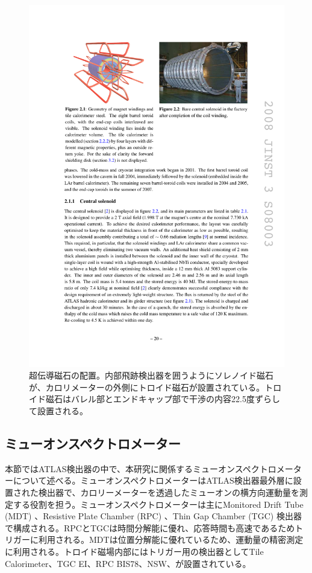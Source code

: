     \begin{figure} 
        \centering
        \includegraphics[width=16cm]{fig/Intro/ATLASmagnet.pdf}
        \caption[超伝導磁石の配置]{超伝導磁石の配置\cite{JINST:2008}。内部飛跡検出器を囲うようにソレノイド磁石が、カロリメーターの外側にトロイド磁石が設置されている。トロイド磁石はバレル部とエンドキャップ部で干渉の内容22.5度ずらして設置される。}
        \label{ATLASmagnet}
    \end{figure}
  
    \subsection{ミューオンスペクトロメーター}
    \label{subsec_Muonspectrometer}
本節ではATLAS検出器の中で、本研究に関係するミューオンスペクトロメーターについて述べる。ミューオンスペクトロメーターはATLAS検出器最外層に設置された検出器で、カロリーメーターを透過したミューオンの横方向運動量を測定する役割を担う。ミューオンスペクトロメーターは主にMonitored Drift Tube  (MDT) 、Resistive Plate Chamber  (RPC) 、Thin Gap Chamber  (TGC)  検出器で構成される。RPCとTGCは時間分解能に優れ、応答時間も高速であるためトリガーに利用される。MDTは位置分解能に優れているため、運動量の精密測定に利用される。トロイド磁場内部にはトリガー用の検出器としてTile Calorimeter、TGC EI、RPC BIS78、NSW、が設置されている。

